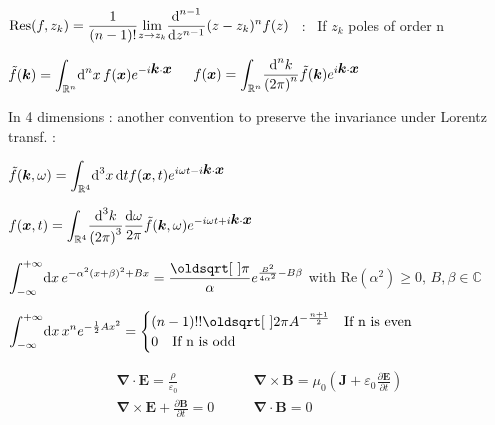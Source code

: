 \begin{squishlist}
\item $\text{Res}(f,z_k) = \dfrac{1}{(n-1)!} \displaystyle{\lim_{z \rightarrow z_k}} \dfrac{\textrm{d} ^{n-1}}{\textrm{d} z^{n-1}} (z-z_k)^{n} f(z)$ \, : \, If $z_k$ poles of order n  
\end{squishlist}

$\tilde{f}(\mbox{\boldmath$k$}) = \displaystyle{\int_{\mathbb{R}^n}} \textrm{d} ^n x \, f(\mbox{\boldmath$x$}) e^{-i\mbox{\boldmath$k$}\cdot\mbox{\boldmath$x$}}$ $ \quad f(\mbox{\boldmath$x$}) = \displaystyle{\int_{\mathbb{R}^n}} \dfrac{\textrm{d} ^n k}{\left(2\pi\right)^n} \tilde{f}(\mbox{\boldmath$k$})e^{i \mbox{\boldmath$k$}\cdot\mbox{\boldmath$x$}}$  

In 4 dimensions : another convention to preserve the invariance under Lorentz transf. : 

$\tilde{f}(\mbox{\boldmath$k$},\omega) = \displaystyle{\int_{\mathbb{R}^4}} \textrm{d} ^3x\, \textrm{d} t f(\mbox{\boldmath$x$},t) e^{i\omega t - i \mbox{\boldmath$k$}\cdot\mbox{\boldmath$x$}}$  

$f(\mbox{\boldmath$x$}, t) = \displaystyle{\int_{\mathbb{R}^4}} \dfrac{\textrm{d} ^3k}{\left(2\pi\right)^3} \dfrac{\textrm{d} \omega}{2\pi} \tilde{f}(\mbox{\boldmath$k$},\omega)e^{-i\omega t + i \mbox{\boldmath$k$}\cdot\mbox{\boldmath$x$}}$


\begin{squishlist}
\item $\displaystyle{\int_{-\infty}^{+\infty}} \ud x \, e^{-\alpha^2(x+\beta)^2 + Bx} = \dfrac{\sqrt{\pi}}{\alpha} \displaystyle{e^{\frac{B^2}{4\alpha^2}-B\beta}} $ with Re$(\alpha^2) \ge 0, \, B, \beta \in \mathbb{C}$ 

\item $      \displaystyle{\int_{-\infty}^{+\infty}} \ud x \, x^n e^{-\frac{1}{2}Ax^2} = 
\begin{cases}
(n-1)!!\sqrt{2\pi}A^{-\frac{n+1}{2}} \quad \text{If n is even} \\
0 \quad \text{If n is odd}
\end{cases}
$
\end{squishlist}


$$\boxed{\begin{split}
\boldsymbol{\nabla} \cdot \boldsymbol{E} = \frac{\rho}{\varepsilon_0}
\qquad &\boldsymbol{\nabla} \times \boldsymbol{B} = \mu_0 \left(\boldsymbol{J} + \varepsilon_0\frac{\partial \boldsymbol{E}}{\partial t}\right)\\
\boldsymbol{\nabla} \times \boldsymbol{E} + \frac{\partial \boldsymbol{B}}{\partial t} = 0
\qquad &\boldsymbol{\nabla} \cdot \boldsymbol{B} = 0
\end{split}}$$


